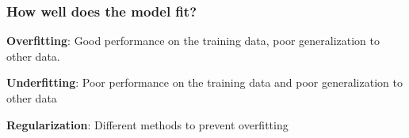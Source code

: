 \documentclass[aspectratio=169]{beamer}
\begin{document}
\begin{frame}
  \frametitle{How well does the model fit?}

  \begin{block}{}
    \begin{center}
      \textbf{Overfitting}: Good performance on the training data, poor
      generalization to other data.\\      
    \end{center}
  \end{block}
  \begin{block}{}
    \begin{center}
      \textbf{Underfitting}: Poor performance on the training data and
      poor generalization to other data\\
    \end{center}
  \end{block}
  
  \begin{block}{}
    \begin{center}
      \textbf{Regularization}: Different methods to prevent overfitting\\
    \end{center}
  \end{block}
  
\end{frame}


  

\end{document}
